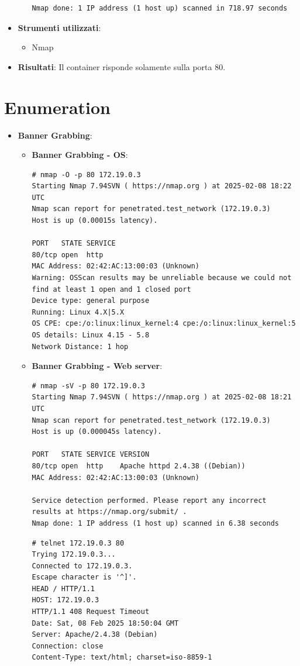 \documentclass[12pt]{article}
\begin{document}
\begin{itemize}
\begin{itemize}
\begin{lstlisting}[label=shell, basicstyle=\tiny]
Nmap done: 1 IP address (1 host up) scanned in 718.97 seconds
        \end{lstlisting}
    \end{itemize}
    \item \textbf{Strumenti utilizzati}:
    \begin{itemize}
        \item Nmap
    \end{itemize}
    \item \textbf{Risultati}: Il container risponde solamente sulla porta 80.
\end{itemize} 

\section{Enumeration}
    \begin{itemize}
        \item \textbf{Banner Grabbing}:
        \begin{itemize}
            \item \textbf{Banner Grabbing - OS}:
            \begin{lstlisting}[label=shell, basicstyle=\tiny]
# nmap -O -p 80 172.19.0.3
Starting Nmap 7.94SVN ( https://nmap.org ) at 2025-02-08 18:22 UTC
Nmap scan report for penetrated.test_network (172.19.0.3)
Host is up (0.00015s latency).

PORT   STATE SERVICE
80/tcp open  http
MAC Address: 02:42:AC:13:00:03 (Unknown)
Warning: OSScan results may be unreliable because we could not find at least 1 open and 1 closed port
Device type: general purpose
Running: Linux 4.X|5.X
OS CPE: cpe:/o:linux:linux_kernel:4 cpe:/o:linux:linux_kernel:5
OS details: Linux 4.15 - 5.8
Network Distance: 1 hop
            \end{lstlisting}
            \item \textbf{Banner Grabbing - Web server}:
            \begin{lstlisting}[label=shell, basicstyle=\tiny]
# nmap -sV -p 80 172.19.0.3
Starting Nmap 7.94SVN ( https://nmap.org ) at 2025-02-08 18:21 UTC
Nmap scan report for penetrated.test_network (172.19.0.3)
Host is up (0.000045s latency).

PORT   STATE SERVICE VERSION
80/tcp open  http    Apache httpd 2.4.38 ((Debian))
MAC Address: 02:42:AC:13:00:03 (Unknown)

Service detection performed. Please report any incorrect results at https://nmap.org/submit/ .
Nmap done: 1 IP address (1 host up) scanned in 6.38 seconds            
            \end{lstlisting}
            \begin{lstlisting}[label=shell, basicstyle=\tiny]
# telnet 172.19.0.3 80
Trying 172.19.0.3...
Connected to 172.19.0.3.
Escape character is '^]'.
HEAD / HTTP/1.1
HOST: 172.19.0.3
HTTP/1.1 408 Request Timeout
Date: Sat, 08 Feb 2025 18:50:04 GMT
Server: Apache/2.4.38 (Debian)
Connection: close
Content-Type: text/html; charset=iso-8859-1


\end{lstlisting}
\end{itemize}
\end{itemize}
\end{document}

